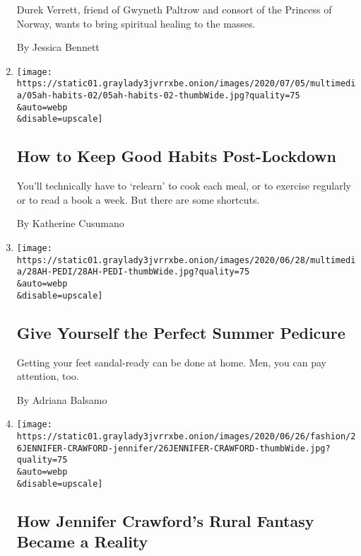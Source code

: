 \begin{enumerate}
  Durek Verrett, friend of Gwyneth Paltrow and consort of the Princess
  of Norway, wants to bring spiritual healing to the masses.

  By Jessica Bennett
\item
  \href{/2020/07/02/at-home/coronavirus-keep-good-habits.html}{}

  \texttt{[image: https://static01.graylady3jvrrxbe.onion/images/2020/07/05/multimedia/05ah-habits-02/05ah-habits-02-thumbWide.jpg?quality=75\\\&auto=webp\\\&disable=upscale]}

  \hypertarget{how-to-keep-good-habits-post-lockdown}{%
  \subsection{How to Keep Good Habits
  Post-Lockdown}\label{how-to-keep-good-habits-post-lockdown}}

  You'll technically have to `relearn' to cook each meal, or to exercise
  regularly or to read a book a week. But there are some shortcuts.

  By Katherine Cusumano
\item
  \href{/2020/06/27/at-home/coronavirus-DIY-pedicure.html}{}

  \texttt{[image: https://static01.graylady3jvrrxbe.onion/images/2020/06/28/multimedia/28AH-PEDI/28AH-PEDI-thumbWide.jpg?quality=75\\\&auto=webp\\\&disable=upscale]}

  \hypertarget{give-yourself-the-perfect-summer-pedicure}{%
  \subsection{Give Yourself the Perfect Summer
  Pedicure}\label{give-yourself-the-perfect-summer-pedicure}}

  Getting your feet sandal-ready can be done at home. Men, you can pay
  attention, too.

  By Adriana Balsamo
\item
  \href{/2020/06/26/style/self-care/how-jennifer-crawfords-rural-fantasy-became-a-reality.html}{}

  \texttt{[image: https://static01.graylady3jvrrxbe.onion/images/2020/06/26/fashion/26JENNIFER-CRAWFORD-jennifer/26JENNIFER-CRAWFORD-thumbWide.jpg?quality=75\\\&auto=webp\\\&disable=upscale]}

  \hypertarget{how-jennifer-crawfords-rural-fantasy-became-a-reality}{%
  \subsection{How Jennifer Crawford's Rural Fantasy Became a
  Reality}\label{how-jennifer-crawfords-rural-fantasy-became-a-reality}}


\end{enumerate}
